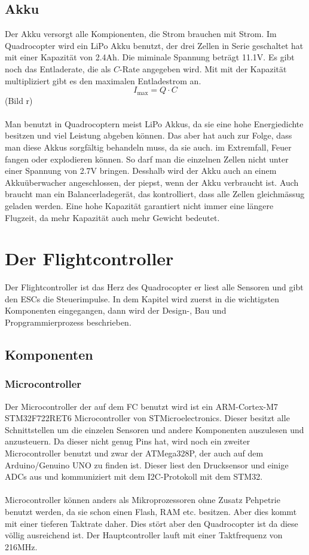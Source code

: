 \documentclass[12pt,a4paper, ngerman]{article}
\begin{document}
\subsection{Akku}
Der Akku versorgt alle Kompionenten, die Strom brauchen mit Strom. Im Quadrocopter wird ein LiPo Akku benutzt, der drei Zellen in Serie geschaltet hat mit einer Kapazität von 2.4Ah. Die miminale Spannung beträgt 11.1V. Es gibt noch das Entladerate, die als $C$-Rate angegeben wird. Mit mit der Kapazität multipliziert gibt es den maximalen Entladestrom an.\cite{website:fpvracing.ch_Mult_Komp}
\begin{equation}
I_{\text{max}}=Q\cdot C
\end{equation} (Bild r)\\ \\
Man benutzt in Quadrocoptern meist LiPo Akkus, da sie eine hohe Energiedichte besitzen und viel Leistung abgeben können. Das aber hat auch zur Folge, dass man diese Akkus sorgfältig behandeln muss, da sie auch. im Extremfall, Feuer fangen oder explodieren können. So darf man die einzelnen Zellen nicht unter einer Spannung von 2.7V bringen. Desshalb wird der Akku auch an einem Akkuüberwacher angeschlossen, der piepst, wenn der Akku verbraucht ist. Auch braucht man ein Balancerladegerät, das kontrolliert, dass alle Zellen gleichmässug geladen werden. Eine hohe Kapazität garantiert nicht immer eine längere Flugzeit, da mehr Kapazität auch mehr Gewicht bedeutet.\cite{website:fpvracing.ch_Mult_Komp}
\newpage

\section{Der Flightcontroller}
Der Flightcontroller ist das Herz des Quadrocopter er liest alle Sensoren und gibt den ESCs die Steuerimpulse. In dem Kapitel wird zuerst in die wichtigsten Komponenten eingegangen, dann wird der Design-, Bau und Propgrammierprozess beschrieben.
\subsection{Komponenten}
\subsubsection{Microcontroller}
Der Microcontroller der auf dem FC benutzt wird ist ein ARM-Cortex-M7 STM32F722RET6 Microcontroller von STMicroelectronics. Dieser besitzt alle Schnittstellen um die einzelen Sensoren und andere Komponenten auszulesen und anzusteuern. Da dieser nicht genug Pins hat, wird noch ein zweiter Microcontroller benutzt und zwar der ATMega328P, der auch auf dem Arduino/Genuino UNO zu finden ist. Dieser liest den Drucksensor und einige ADCs aus und kommuniziert mit dem I2C-Protokoll mit dem STM32. \\ \\
Microcontroller können anders als Mikroprozessoren ohne Zusatz Pehpetrie benutzt werden, da sie schon einen Flash, RAM etc. besitzen. Aber dies kommt mit einer tieferen Taktrate daher. Dies stört aber den Quadrocopter ist da diese völlig ausreichend ist. Der Hauptcontroller lauft mit einer Taktfrequenz von 216MHz.
\end{document}
